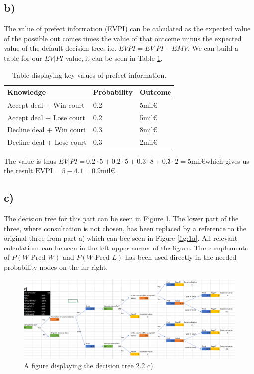 \documentclass{article}
\begin{document}
\subsection{b)}
	The value of prefect information (EVPI) can be calculated as the expected value of the possible out comes times the value of that outcome minus the expected value of the default decision tree, i.e. $EVPI = EV|PI - EMV$.
	We can build a table for our $EV|PI$-value, it can be seen in Table \ref{tab:2b}.
	\begin{table}[h]
		\centering
		\caption{Table displaying key values of prefect information. }
		\label{tab:2b}
		\begin{tabular}{l|l|l}
			Knowledge                 & Probability & Outcome \\ \hline
			Accept deal + Win court   & 0.2         & 5mil\euro   \\
			Accept deal + Lose court  & 0.2         & 5mil\euro   \\
			Decline deal + Win court  & 0.3         & 8mil\euro   \\
			Decline deal + Lose court & 0.3         & 2mil\euro  
		\end{tabular}
	\end{table}
	The value is thus $EV|PI = 0.2\cdot5+0.2\cdot5+0.3\cdot8+0.3\cdot2 = 5$mil\euro which gives us the result $\text{EVPI} = 5 - 4.1 = 0.9$mil\euro.
\subsection{c)}
	The decision tree for this part can be seen in Figure \ref{fig:2c}. The lower part of the three, where consultation is not chosen, has been replaced by a reference to the original three from part a) which can bee seen in Figure \ref{fig:1a}. All relevant calculations can be seen in the left upper corner of the figure. The complements of $P(W|\text{Pred } W)$ and $P(W|\text{Pred } L)$ has been used directly in the needed probability nodes on the far right. 
	\begin{figure}[H]
		\includegraphics[width=\textwidth]{2c.png}
		\caption{A figure displaying the decision tree 2.2 c)}
		\label{fig:2c}
	\end{figure}
\end{document}
